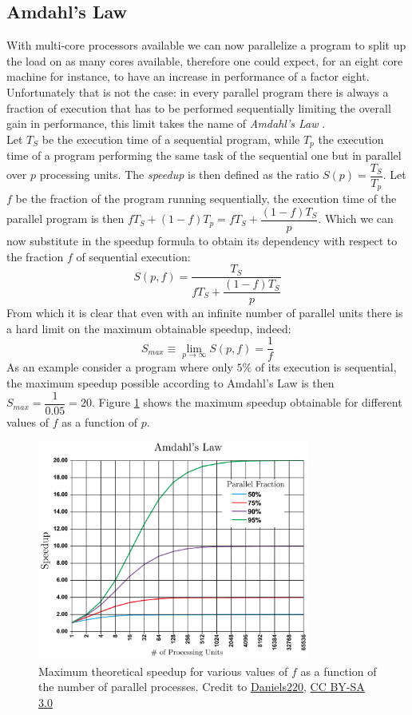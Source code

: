 \subsection{Amdahl's Law}
With multi-core processors available we can now parallelize a program to split up the load on as many cores available, therefore one could expect, for an eight core machine for instance, to have an increase in performance of a factor eight. Unfortunately that is not the case: in every parallel program there is always a fraction of execution that has to be performed sequentially limiting the overall gain in performance, this limit takes the name of \textit{Amdahl's Law} \cite{amdahl}.\\
Let $T_S$ be the execution time of a sequential program, while $T_p$ the execution time of a program performing the same task of the sequential one but in parallel over $p$ processing units. The \textit{speedup} is then defined as the ratio $S(p) = \dfrac{T_S}{T_p}$.
Let $f$ be the fraction of the program running sequentially, the execution time of the parallel program is then $f T_S + (1 - f) T_p = f T_S + \dfrac{(1-f)T_S}{p}$. Which we can now substitute in the speedup formula to obtain its dependency with respect to the fraction $f$ of sequential execution:
\begin{equation}
S(p,f) = \dfrac{T_S}{f T_S + \dfrac{(1-f)T_S}{p}}
\end{equation}
From which it is clear that even with an infinite number of parallel units there is a hard limit on the maximum obtainable speedup, indeed:
\begin{equation}
S_{max} \equiv \lim_{p\to\infty} S(p,f) = \dfrac{1}{f}
\end{equation}
As an example consider a program where only $5\%$ of its execution is sequential, the maximum speedup possible according to Amdahl's Law is then $S_{max} = \dfrac{1}{0.05} = 20$.
Figure \ref{amdahl} shows the maximum speedup obtainable for different values of $f$ as a function of $p$.

\begin{figure}
\centerline{\includegraphics[width=0.8\textwidth]{architectures/amdahl.png}}
\caption{Maximum theoretical speedup for various values of $f$ as a function of the number of parallel processes. Credit to \href{https://en.wikipedia.org/wiki/User:Daniels220}{Daniels220}, \href{http://creativecommons.org/licenses/by-sa/3.0/}{CC BY-SA 3.0}}
\label{amdahl}
\end{figure}

